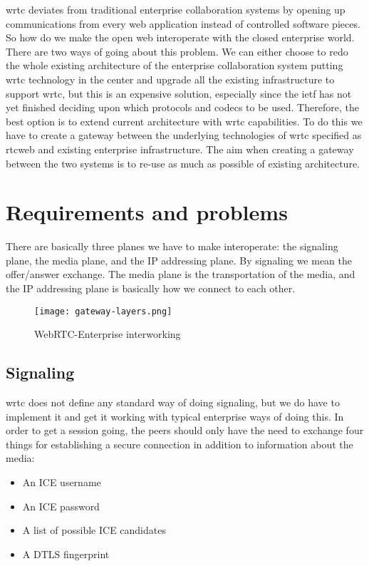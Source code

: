 \gls{wrtc} deviates from traditional enterprise collaboration systems by opening up communications from every web application instead of controlled software pieces. So how do we make the open web interoperate with the closed enterprise world. There are two ways of going about this problem. We can either choose to redo the whole existing architecture of the enterprise collaboration system putting \gls{wrtc} technology in the center and upgrade all the existing infrastructure to support \gls{wrtc}, but this is an expensive solution, especially since the \gls{ietf} has not yet finished deciding upon which protocols and codecs to be used. Therefore, the best option is to extend current architecture with \gls{wrtc} capabilities. To do this we have to create a gateway between the underlying technologies of \gls{wrtc} specified as \gls{rtcweb} and existing enterprise infrastructure. The aim when creating a gateway between the two systems is to re-use as much as possible of existing architecture.

\section{Requirements and problems}
There are basically three planes we have to make interoperate: the signaling plane, the media plane, and the IP addressing plane. 
By signaling we mean the offer/answer exchange. The media plane is the transportation of the media, and the IP addressing plane is basically how we connect to each other.

\begin{figure}[here]
\centerline{\texttt{[image: gateway-layers.png]}}
\caption{WebRTC-Enterprise interworking}
\label{fig:gateway-layers}
\end{figure}

\subsection{Signaling}
\gls{wrtc} does not define any standard way of doing signaling, but we do have to implement it and get it working with typical enterprise ways of doing this. In order to get a session going, the peers should only have the need to exchange four things for establishing a secure connection in addition to information about the media:

\begin{itemize}
\item{An ICE username}
\item{An ICE password}
\item{A list of possible ICE candidates}
\item{A DTLS fingerprint}
\end{itemize}

